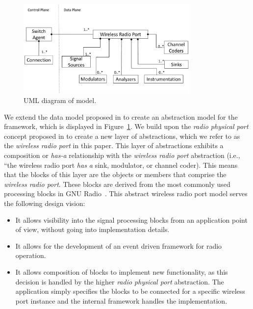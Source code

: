 \begin{figure}[t]
  \centering
  \includegraphics[width=0.8\textwidth]{figures/UML.pdf}
  \caption{UML diagram of \crossflow model.}
  \label{fig:uml}
\end{figure}


We extend the data model proposed in \cite{Casey:14} to create an abstraction model for the \crossflow framework, which is displayed in Figure~\ref{fig:uml}. We build upon the \emph{radio physical port} concept proposed in \cite{aetherflow} to create a new layer of abstractions, which we refer to as the \emph{wireless radio port} in this paper. This layer of abstractions exhibits a composition or \emph{has-a} relationship with the \emph{wireless radio port} abstraction (i.e., ``the wireless radio port \emph{has a} sink, modulator, or channel coder). This means that the blocks of this layer are the objects or members that comprise the \emph{wireless radio port}. These blocks are derived from the most commonly used processing blocks in GNU Radio~\cite{gnuradio}. This abstract wireless radio port model serves the following design vision:

\begin{itemize}
\item It allows visibility into the signal processing blocks from an application point of view, without going into implementation details.
\item It allows for the development of an event driven framework for radio operation.
\item It allows composition of blocks to implement new functionality, as this decision is handled by the higher \emph{radio physical port} abstraction. The application simply specifies the blocks to be connected for a specific wireless port instance and the internal framework handles the implementation.
\end{itemize}

